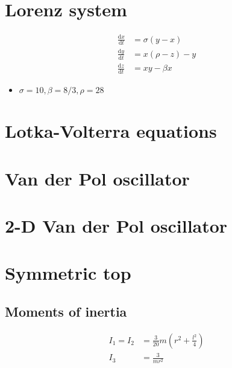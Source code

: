 \documentclass{report}
\begin{document}
\chapter{Lorenz system}

\begin{align}
  \frac{\mathrm{d}x}{\mathrm{d}t} &= \sigma(y - x) \\
  \frac{\mathrm{d}y}{\mathrm{d}t} &= x(\rho - z) - y \\
  \frac{\mathrm{d}z}{\mathrm{d}t} &= xy - \beta x
\end{align}

\begin{itemize}
  \item $\sigma = 10, \beta = 8/3, \rho = 28$
\end{itemize}


\chapter{Lotka-Volterra equations}


\chapter{Van der Pol oscillator}


\chapter{2-D Van der Pol oscillator}


\chapter{Symmetric top}

\section{Moments of inertia}

\begin{align}
  I_1 = I_2 &= \frac{3}{20} m \left( r^2 + \frac{l^2}{4} \right) \\
  I_3 &= \frac{3}{m r^2}
\end{align}
\end{document}
